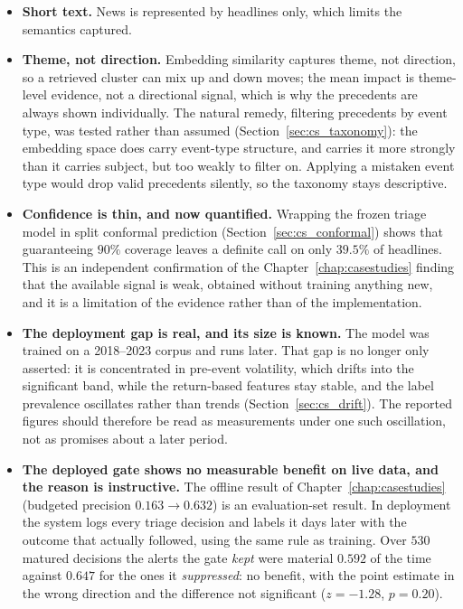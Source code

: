 \begin{itemize}
        also markedly uneven: the worst-covered name reaches only $50\%$ while five names exceed
        $97\%$, and the worst-covered name is simultaneously the one with the highest headline density,
        so its coverage arrives in bursts. The obvious explanation, truncation against the provider's
        per-request ceiling, was tested and rejected: no request window in the corpus came within a
        third of that ceiling.
  \item \textbf{Short text.} News is represented by headlines only, which limits the semantics captured.
  \item \textbf{Theme, not direction.} Embedding similarity captures theme, not direction, so a retrieved
        cluster can mix up and down moves; the mean impact is theme-level evidence, not a directional
        signal, which is why the precedents are always shown individually. The natural remedy, filtering
        precedents by event type, was tested rather than assumed
        (Section~\ref{sec:cs_taxonomy}): the embedding space does carry event-type structure, and
        carries it more strongly than it carries subject, but too weakly to filter on. Applying a
        mistaken event type would drop valid precedents silently, so the taxonomy stays descriptive.
  \item \textbf{Confidence is thin, and now quantified.} Wrapping the frozen triage model in split
        conformal prediction (Section~\ref{sec:cs_conformal}) shows that guaranteeing $90\%$ coverage
        leaves a definite call on only $39.5\%$ of headlines. This is an independent confirmation of the
        Chapter~\ref{chap:casestudies} finding that the available signal is weak, obtained without
        training anything new, and it is a limitation of the evidence rather than of the implementation.
  \item \textbf{The deployment gap is real, and its size is known.} The model was trained on a
        2018--2023 corpus and runs later. That gap is no longer only asserted: it is concentrated in
        pre-event volatility, which drifts into the significant band, while the return-based features
        stay stable, and the label prevalence oscillates rather than trends
        (Section~\ref{sec:cs_drift}). The reported figures should therefore be read as measurements
        under one such oscillation, not as promises about a later period.
  \item \textbf{The deployed gate shows no measurable benefit on live data, and the reason is
        instructive.} The offline result of Chapter~\ref{chap:casestudies} (budgeted precision
        $0.163 \to 0.632$) is an evaluation-set result. In deployment the system logs every triage
        decision and labels it days later with the outcome that actually followed, using the same
        rule as training. Over $530$ matured decisions the alerts the gate \emph{kept} were material
        $0.592$ of the time against $0.647$ for the ones it \emph{suppressed}: no benefit, with the
        point estimate in the wrong direction and the difference not significant
        ($z = -1.28$, $p = 0.20$).


\end{itemize}
